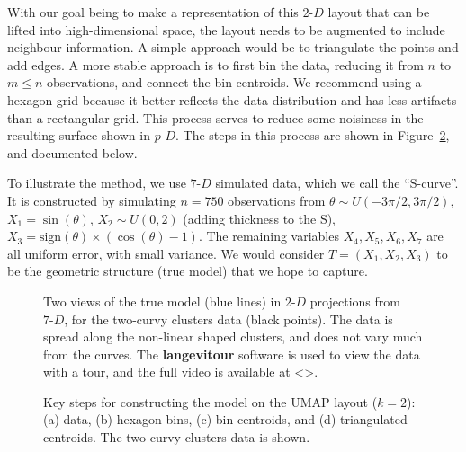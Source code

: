 \documentclass[
  12pt]{article}
\newcommand\pD{$p\text{-}D$}
\newcommand\gD{$2\text{-}D$}
\begin{document}
With our goal being to make a representation of this \gD{} layout that
can be lifted into high-dimensional space, the layout needs to be
augmented to include neighbour information. A simple approach would be
to triangulate the points and add edges. A more stable approach is to
first bin the data, reducing it from \(n\) to \(m\leq n\) observations,
and connect the bin centroids. We recommend using a hexagon grid because
it better reflects the data distribution and has less artifacts than a
rectangular grid. This process serves to reduce some noisiness in the
resulting surface shown in \pD{}. The steps in this process are shown in
Figure~\ref{fig-NLDR-two-curvy}, and documented below.

To illustrate the method, we use \(7\text{-}D\) simulated data, which we
call the ``S-curve''. It is constructed by simulating \(n=750\)
observations from \(\theta \sim U(-3\pi/2, 3\pi/2)\),
\(X_1 = \sin(\theta)\), \(X_2 \sim U(0, 2)\) (adding thickness to the
S), \(X_3 = \text{sign}(\theta) \times (\cos(\theta) - 1)\). The
remaining variables \(X_4, X_5, X_6, X_7\) are all uniform error, with
small variance. We would consider \(T=(X_1, X_2, X_3)\) to be the
geometric structure (true model) that we hope to capture.

\begin{figure}[H]


\caption{\label{fig-two-curvy-true-proj}Two views of the true model
(blue lines) in \(2\text{-}D\) projections from \(7\text{-}D\), for the
two-curvy clusters data (black points). The data is spread along the
non-linear shaped clusters, and does not vary much from the curves. The
\textbf{langevitour} software is used to view the data with a tour, and
the full video is available at \textless\textgreater.}

\end{figure}%

\begin{figure}


\caption{\label{fig-NLDR-two-curvy}Key steps for constructing the model
on the UMAP layout (\(k=2\)): (a) data, (b) hexagon bins, (c) bin
centroids, and (d) triangulated centroids. The two-curvy clusters data
is shown.}

\end{figure}%
\end{document}
